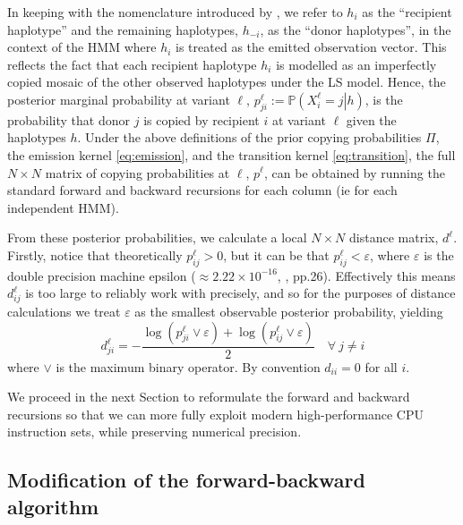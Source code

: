 \documentclass[pdflatex,referee,lineno,sn-nature]{sn-jnl}%
\begin{document}
In keeping with the nomenclature introduced by \cite{lawson2012inference}, we refer to \(h_i\) as the ``recipient haplotype'' and the remaining haplotypes, \(h_{-i}\), as the ``donor haplotypes'', in the context of the HMM where \(h_{i}\) is treated as the emitted observation vector.
This reflects the fact that each recipient haplotype \(h_i\) is modelled as an imperfectly copied mosaic of the other observed haplotypes under the LS model.
Hence, the posterior marginal probability at variant \(\ell\), \(p^{\ell}_{ji} := \mathbb{P}\left(\left. X_i^\ell = j \right| h\right)\), is the probability that donor \(j\) is copied by recipient \(i\) at variant \(\ell\) given the haplotypes \(h\).
Under the above definitions of the prior copying probabilities \(\Pi\), the emission kernel \eqref{eq:emission}, and the transition kernel \eqref{eq:transition}, the full \(N \times N\) matrix of copying probabilities at \(\ell\), \(p^\ell\), can be obtained by running the standard forward and backward recursions \cite{rabiner1989tutorial} for each column (ie for each independent HMM).

From these posterior probabilities, we calculate a local \(N \times N\) distance matrix, \(d^\ell\).
Firstly, notice that theoretically \(p_{ij}^\ell > 0\), but it can be that \(p_{ij}^\ell < \varepsilon\), where \(\varepsilon\) is the double precision machine epsilon (\(\approx 2.22\times10^{-16}\), \cite{C18}, pp.26).
Effectively this means \(d_{ij}^\ell\) is too large to reliably work with precisely, and so for the purposes of distance calculations we treat \(\varepsilon\) as the smallest observable posterior probability, yielding \begin{equation}
	d_{ji}^\ell = -\frac{\log\left(p_{ji}^\ell \vee \varepsilon \right) + \log\left(p_{ij}^\ell \vee \varepsilon  \right)}{2} \quad \forall\ j \neq i \label{eq:distmat}
\end{equation}
where \(\vee\) is the maximum binary operator.
By convention \(d_{ii} = 0\) for all \(i\).

We proceed in the next Section to reformulate the forward and backward recursions so that we can more fully exploit modern high-performance CPU instruction sets, while preserving numerical precision.



\subsection*{Modification of the forward-backward algorithm}
\label{sec:reformulation}
\end{document}
